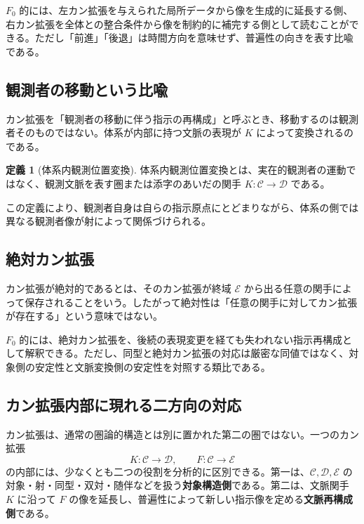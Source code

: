 \documentclass[a4paper,11pt]{ltjsarticle}
\theoremstyle{definition}
\newtheorem{definition}{定義}[section]
\theoremstyle{plain}
\begin{document}
$F_0$ 的には、左カン拡張を与えられた局所データから像を生成的に延長する側、右カン拡張を全体との整合条件から像を制約的に補完する側として読むことができる。ただし「前進」「後退」は時間方向を意味せず、普遍性の向きを表す比喩である。

\subsection{観測者の移動という比喩}

カン拡張を「観測者の移動に伴う指示の再構成」と呼ぶとき、移動するのは観測者そのものではない。体系が内部に持つ文脈の表現が $K$ によって変換されるのである。

\begin{definition}[体系内観測位置変換]
体系内観測位置変換とは、実在的観測者の運動ではなく、観測文脈を表す圏または添字のあいだの関手 $K:\mathcal C\to\mathcal D$ である。
\end{definition}

この定義により、観測者自身は自らの指示原点にとどまりながら、体系の側では異なる観測者像が射によって関係づけられる。

\subsection{絶対カン拡張}

カン拡張が絶対的であるとは、そのカン拡張が終域 $\mathcal E$ から出る任意の関手によって保存されることをいう。したがって絶対性は「任意の関手に対してカン拡張が存在する」という意味ではない。

$F_0$ 的には、絶対カン拡張を、後続の表現変更を経ても失われない指示再構成として解釈できる。ただし、同型と絶対カン拡張の対応は厳密な同値ではなく、対象側の安定性と文脈変換側の安定性を対照する類比である。

\subsection{カン拡張内部に現れる二方向の対応}

カン拡張は、通常の圏論的構造とは別に置かれた第二の圏ではない。一つのカン拡張
\begin{equation}
 K:\mathcal C\to\mathcal D,
 \qquad
 F:\mathcal C\to\mathcal E
\end{equation}
の内部には、少なくとも二つの役割を分析的に区別できる。第一は、$\mathcal C,\mathcal D,\mathcal E$ の対象・射・同型・双対・随伴などを扱う\textbf{対象構造側}である。第二は、文脈関手 $K$ に沿って $F$ の像を延長し、普遍性によって新しい指示像を定める\textbf{文脈再構成側}である。
\end{document}
